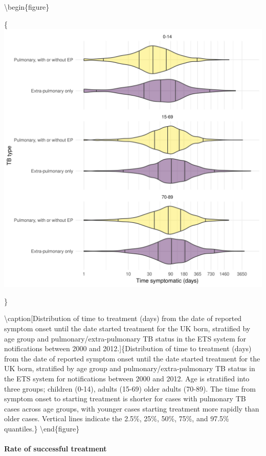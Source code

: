 \documentclass[11pt,twoside]{bristolthesis}
\begin{document}
  \textbackslash{}begin\{figure\}
  
  \{\centering \includegraphics[width=0.8\linewidth,]{chapters/model-development/resources/figure/time_to_treatment}
  
  \}
  
  \textbackslash{}caption{[}Distribution of time to treatment (days) from the date of reported symptom onset until the date started treatment for the UK born, stratified by age group and pulmonary/extra-pulmonary TB status in the ETS system for notifications between 2000 and 2012.{]}\{Distribution of time to treatment (days) from the date of reported symptom onset until the date started treatment for the UK born, stratified by age group and pulmonary/extra-pulmonary TB status in the ETS system for notifications between 2000 and 2012. Age is stratified into three groups; children (0-14), adults (15-69) older adults (70-89). The time from symptom onset to starting treatment is shorter for cases with pulmonary TB cases across age groups, with younger cases starting treatment more rapidly than older cases. Vertical lines indicate the 2.5\%, 25\%, 50\%, 75\%, and 97.5\% quantiles.\}\label{fig:tb-time-treat}
  \textbackslash{}end\{figure\}
  
  \hypertarget{rate-of-successful-treatment}{%
  \paragraph{Rate of successful treatment}\label{rate-of-successful-treatment}}
  
\end{document}
